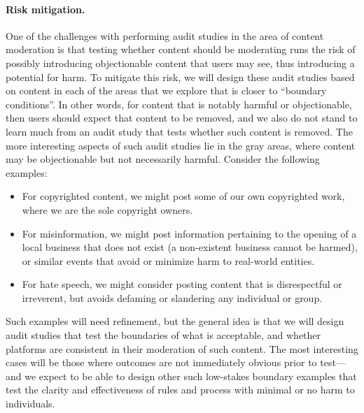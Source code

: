 \paragraph{Risk mitigation.}
One of the challenges with performing audit studies in the area of content
moderation is that testing whether content should be moderating runs the risk
of possibly introducing objectionable content that users may see, thus
introducing a potential for harm. To mitigate this risk, we will design these
audit studies based on content in each of the areas that we explore that is
closer to ``boundary conditions''. In other words, for content that is notably
harmful or objectionable, then users should expect that content to be removed,
and we also do not stand to learn much from an audit study that tests whether
such content is removed. The more interesting aspects of such audit studies
lie in the gray areas, where content may be objectionable but not necessarily
harmful. Consider the following examples:
\begin{itemize}
    \itemsep=-1pt
    \item For copyrighted content, we might post some of our own
        copyrighted work, where we are the sole copyright owners.
    \item For misinformation, we might post information pertaining to the
        opening of a local business that does not exist (a non-existent
        business cannot be harmed), or similar events that avoid or minimize harm
        to real-world entities.
    \item For hate speech, we might consider posting content that is
        disrespectful or irreverent, but avoids defaming or slandering any
        individual or group.
\end{itemize}
\noindent
Such examples will need refinement, but the general idea is that we will
design audit studies that test the boundaries of what is acceptable, and
whether platforms are consistent in their moderation of such content. The most
interesting cases will be those where outcomes are not immediately obvious
prior to test---and we expect to be able to design other such low-stakes
boundary examples that test the clarity and effectiveness of rules and process
with minimal or no harm to individuals.



